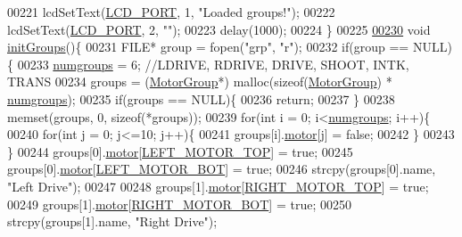 \begin{DoxyCode}
00221     lcdSetText(\hyperlink{lcdmsg_8h_abcf42bd88b3c36193f301ca25b033875}{LCD\_PORT}, 1, \textcolor{stringliteral}{"Loaded groups!"});
00222     lcdSetText(\hyperlink{lcdmsg_8h_abcf42bd88b3c36193f301ca25b033875}{LCD\_PORT}, 2, \textcolor{stringliteral}{""});
00223     delay(1000);
00224 \}
00225 
\hypertarget{lcddiag_8c_source.tex_l00230}{}\hyperlink{lcddiag_8h_ad290df3e273598f9f10fe34c257e4084}{00230} \textcolor{keywordtype}{void} \hyperlink{lcddiag_8c_ad290df3e273598f9f10fe34c257e4084}{initGroups}()\{
00231     FILE* group = fopen(\textcolor{stringliteral}{"grp"}, \textcolor{stringliteral}{"r"});
00232     \textcolor{keywordflow}{if}(group == NULL)\{
00233         \hyperlink{lcddiag_8c_a205f1cedec1664555276e0a71a1c87d8}{numgroups} = 6; \textcolor{comment}{//LDRIVE, RDRIVE, DRIVE, SHOOT, INTK, TRANS }
00234         groups = (\hyperlink{struct_motor_group}{MotorGroup}*) malloc(\textcolor{keyword}{sizeof}(\hyperlink{struct_motor_group}{MotorGroup}) * 
      \hyperlink{lcddiag_8c_a205f1cedec1664555276e0a71a1c87d8}{numgroups});
00235         \textcolor{keywordflow}{if}(groups == NULL)\{
00236             \textcolor{keywordflow}{return};
00237         \}
00238         memset(groups, 0, \textcolor{keyword}{sizeof}(*groups));
00239         \textcolor{keywordflow}{for}(\textcolor{keywordtype}{int} i = 0; i<\hyperlink{lcddiag_8c_a205f1cedec1664555276e0a71a1c87d8}{numgroups}; i++)\{
00240             \textcolor{keywordflow}{for}(\textcolor{keywordtype}{int} j = 0; j<=10; j++)\{
00241                 groups[i].\hyperlink{struct_motor_group_a05d10a69eb1ae279fab13f9a009d84be}{motor}[j] = \textcolor{keyword}{false};
00242             \}
00243         \}
00244         groups[0].\hyperlink{struct_motor_group_a05d10a69eb1ae279fab13f9a009d84be}{motor}[\hyperlink{motors_8h_a3e06fbce97caed16e0a0f27f544587af}{LEFT\_MOTOR\_TOP}] = \textcolor{keyword}{true};
00245         groups[0].\hyperlink{struct_motor_group_a05d10a69eb1ae279fab13f9a009d84be}{motor}[\hyperlink{motors_8h_a43691a92e03fa5319b14f01193f47b9a}{LEFT\_MOTOR\_BOT}] = \textcolor{keyword}{true};
00246         strcpy(groups[0].name, \textcolor{stringliteral}{"Left Drive"});
00247 
00248         groups[1].\hyperlink{struct_motor_group_a05d10a69eb1ae279fab13f9a009d84be}{motor}[\hyperlink{motors_8h_a306c5923dd0328c4bfc09255de9d124c}{RIGHT\_MOTOR\_TOP}] = \textcolor{keyword}{true};
00249         groups[1].\hyperlink{struct_motor_group_a05d10a69eb1ae279fab13f9a009d84be}{motor}[\hyperlink{motors_8h_a85c904d091f71ba7fc53a446524b6c61}{RIGHT\_MOTOR\_BOT}] = \textcolor{keyword}{true};
00250         strcpy(groups[1].name, \textcolor{stringliteral}{"Right Drive"});

\end{DoxyCode}
